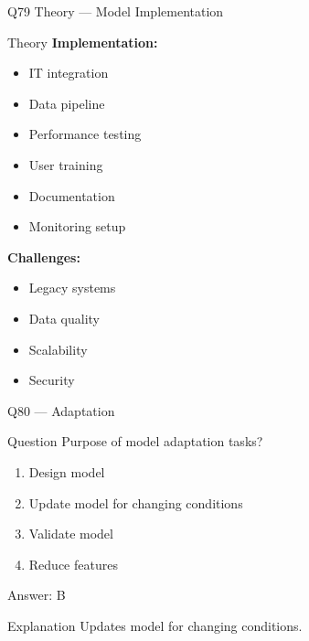 \documentclass[aspectratio=169,8pt]{beamer}
\begin{document}
	\begin{frame}{Q79 Theory --- Model Implementation}
		\begin{block}{Theory}
			\textbf{Implementation:}
			\begin{itemize}
				\item IT integration
				\item Data pipeline
				\item Performance testing
				\item User training
				\item Documentation
				\item Monitoring setup
			\end{itemize}
			\textbf{Challenges:}
			\begin{itemize}
				\item Legacy systems
				\item Data quality
				\item Scalability
				\item Security
			\end{itemize}
		\end{block}
	\end{frame}
	
	\begin{frame}{Q80 --- Adaptation}
		\begin{block}{Question}
			Purpose of model adaptation tasks?
		\end{block}
		\begin{enumerate}[label=\Alph*.]
			\item Design model
			\item Update model for changing conditions
			\item Validate model
			\item Reduce features
		\end{enumerate}
		\begin{exampleblock}{Answer: B}
		\end{exampleblock}
		\begin{block}{Explanation}
			Updates model for changing conditions.
		\end{block}
	\end{frame}
	
\end{document}
